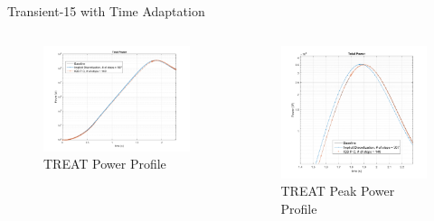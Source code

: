 \documentclass[8pt,xcolor=dvipnames]{beamer}
\begin{document}
\begin{frame}{Transient-15 with Time Adaptation}

\begin{columns}

\begin{figure}
\includegraphics[width=\linewidth]{figures/Tran15_DT2.png}
\caption{TREAT Power Profile}
\end{figure}

\begin{figure}
\includegraphics[width=\linewidth]{figures/Tran15_DT2_peak.png}
\caption{TREAT Peak Power Profile}
\end{figure}

\end{columns}

\end{frame}
\end{document}
